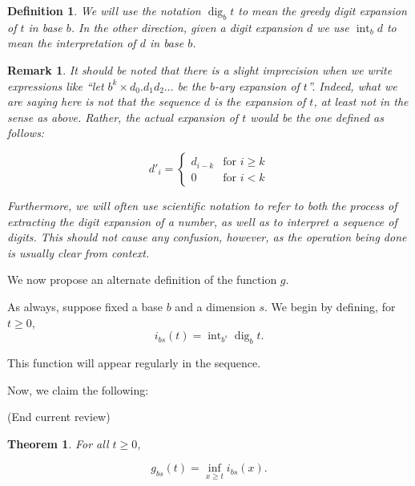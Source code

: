 \documentclass[11pt, reqno]{amsart}
\newtheorem{theorem}{Theorem}
\newtheorem{definition}{Definition}
\newtheorem{remark}{Remark}
\DeclareMathOperator{\dig}{dig}
\DeclareMathOperator{\intr}{int}
\begin{document}
\begin{definition}
We will use the notation $\dig_b t$ to mean the greedy digit expansion of $t$ in base $b$. In the other direction, given a digit expansion $d$ we use $\intr_b d$ to mean the interpretation of $d$ in base $b$.
\end{definition}

\begin{remark}
It should be noted that there is a slight imprecision when we write expressions like ``let $b^k \times d_0 . d_1 d_2 \dots$ be the $b$-ary expansion of $t$''. Indeed, what we are saying here is not that the sequence $d$ is the expansion of $t$, at least not in the sense as above. Rather, the actual expansion of $t$ would be the one defined as follows:

\[d'_i =
\begin{cases}
d_{i-k} & \text{for $i \geq k$}\\
0 & \text{for $i < k$}
\end{cases}
\]

Furthermore, we will often use scientific notation to refer to both the process of extracting the digit expansion of a number, as well as to interpret a sequence of digits. This should not cause any confusion, however, as the operation being done is usually clear from context.
\end{remark}

We now propose an alternate definition of the function $g$.

As always, suppose fixed a base $b$ and a dimension $s$. We begin by defining, for $t \geq 0$,
\[ i_{bs}(t) = \intr_{b^s} \dig_b t.\]

This function will appear regularly in the sequence.

Now, we claim the following:

(End current review)

\begin{theorem} \label{ginfi}
For all $t \geq 0$,

\[g_{bs}(t) = \inf_{x \geq t} i_{bs}(x).\]
\end{theorem}
\end{document}
